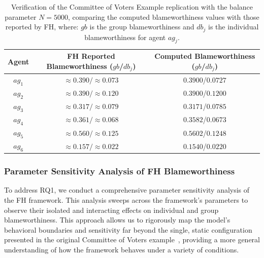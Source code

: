 \documentclass{article}
\begin{document}
\begin{table}[h]
  \centering
  \caption{Verification of the Committee of Voters Example replication with the balance parameter $N=5000$, comparing the computed blameworthiness values with those reported by FH, where: $gb$ is the group blameworthiness and $db_j$ is the individual blameworthiness for agent $ag_j$.}
  \begin{tabular}{|c|c|c|}
    \hline
    Agent & FH Reported Blameworthiness ($gb$/$db_j$) & Computed Blameworthiness ($gb$/$db_j$) \\
    \hline
    $ag_1$ & $\approx 0.390/\approx 0.073$ & $0.3900$/$0.0727$ \\
    $ag_2$ & $\approx 0.390/\approx 0.120$ & $0.3900$/$0.1200$ \\
    $ag_3$ & $\approx 0.317/\approx 0.079$ & $0.3171$/$0.0785$ \\
    $ag_4$ & $\approx 0.361/\approx 0.068$ & $0.3582$/$0.0673$ \\
    $ag_5$ & $\approx 0.560/\approx 0.125$ & $0.5602$/$0.1248$ \\
    $ag_6$ & $\approx 0.157/\approx 0.022$ & $0.1540$/$0.0220$ \\
    \hline
  \end{tabular}
  \label{tab:replication_verification}
\end{table}

\subsubsection{Parameter Sensitivity Analysis of FH Blameworthiness}\label{sec:parameter_sensitivity}


To address RQ1, we conduct a comprehensive parameter sensitivity analysis of the FH framework. This analysis sweeps across the framework's parameters to observe their isolated and interacting effects on individual and group blameworthiness. This approach allows us to rigorously map the model's behavioral boundaries and sensitivity far beyond the single, static configuration presented in the original Committee of Voters example~\cite{friedenberg_blameworthiness_2019}, providing a more general understanding of how the framework behaves under a variety of conditions.
\end{document}
